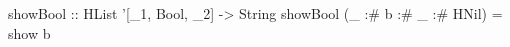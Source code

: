 \begin{code}
showBool :: HList '[_1, Bool, _2] -> String
showBool (_ :# b :# _ :# HNil) = show b
\end{code}
